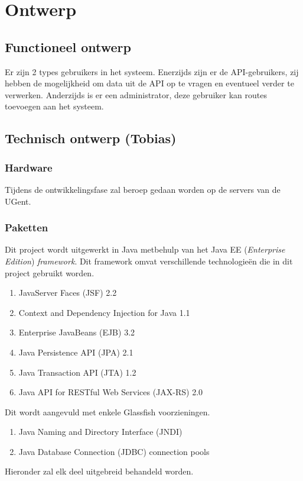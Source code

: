 \documentclass[ps,a4paper,oneside]{report}
\begin{document}
\chapter{Ontwerp}
\section{Functioneel ontwerp}
Er zijn 2 types gebruikers in het systeem. Enerzijds zijn er de API-gebruikers, zij hebben de mogelijkheid om data uit de API op te vragen en eventueel verder te verwerken. Anderzijds is er een administrator, deze gebruiker kan routes toevoegen aan het systeem.
\section{Technisch ontwerp (Tobias)}
\subsection{Hardware}
Tijdens de ontwikkelingsfase zal beroep gedaan worden op de servers van de UGent.
\subsection{Paketten}
Dit project wordt uitgewerkt in Java metbehulp van het Java EE (\textit{Enterprise Edition}) \textit{framework}. Dit framework omvat verschillende technologie\"en die in dit project gebruikt worden. 
\begin{enumerate}	
	\item JavaServer Faces (JSF) 2.2
	\item Context and Dependency Injection for Java 1.1
	\item Enterprise JavaBeans (EJB) 3.2
	\item Java Persistence API (JPA) 2.1
	\item Java Transaction API (JTA) 1.2
	\item Java API for RESTful Web Services (JAX-RS) 2.0
\end{enumerate}
Dit wordt aangevuld met enkele Glassfish voorzieningen.
\begin{enumerate}
	\item Java Naming and Directory Interface (JNDI)
	\item Java Database Connection (JDBC) connection pools
\end{enumerate}
Hieronder zal elk deel uitgebreid behandeld worden.
\end{document}
